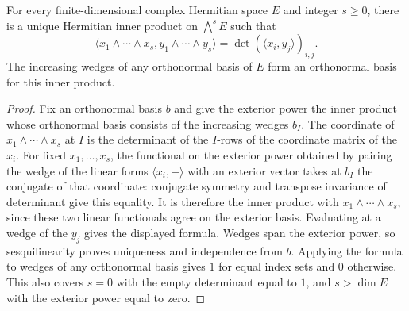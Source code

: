 \begin{lemma}
\label{lem:balanced-exterior-metric}
\leanok
For every finite-dimensional complex Hermitian space $E$ and integer $s\geq0$,
there is a unique Hermitian inner product on $\bigwedge^s E$ such that
\[
 \langle x_1\wedge\cdots\wedge x_s,y_1\wedge\cdots\wedge y_s\rangle
 =\det(\langle x_i,y_j\rangle)_{i,j}.
\]
The increasing wedges of any orthonormal basis of $E$ form an orthonormal
basis for this inner product.
\end{lemma}
\begin{proof}
Fix an orthonormal basis $b$ and give the exterior power the inner product
whose orthonormal basis consists of the increasing wedges $b_I$.
The coordinate of $x_1\wedge\cdots\wedge x_s$ at $I$ is the determinant
of the $I$-rows of the coordinate matrix of the $x_i$.
For fixed $x_1,\ldots,x_s$, the functional on the exterior power obtained
by pairing the wedge of the linear forms $\langle x_i,-\rangle$ with
an exterior vector takes at $b_I$ the conjugate of that coordinate:
conjugate symmetry and transpose invariance of determinant give this equality.
It is therefore the inner product with $x_1\wedge\cdots\wedge x_s$,
since these two linear functionals agree on the exterior basis.
Evaluating at a wedge of the $y_j$ gives the displayed formula.
Wedges span the exterior power, so sesquilinearity proves uniqueness and
independence from $b$. Applying the formula to wedges of any orthonormal
basis gives $1$ for equal index sets and $0$ otherwise. This also covers
$s=0$ with the empty determinant equal to $1$, and $s>\dim E$ with
the exterior power equal to zero.
\end{proof}

